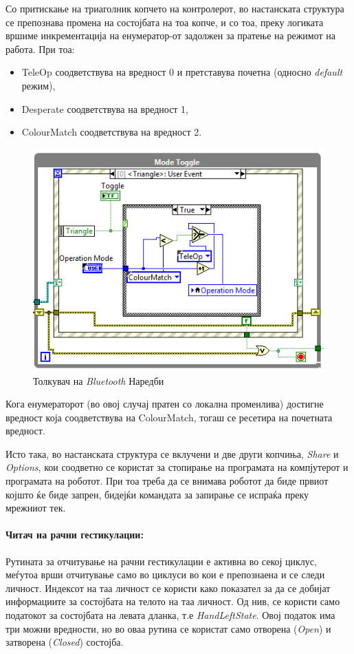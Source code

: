 \documentclass[11pt]{article}
\begin{document}
      Со притискање на триаголник копчето на контролерот, во настанската структура се препознава промена на состојбата на тоа копче, и со тоа, преку логиката вршиме инкрементација на енумератор-от задолжен за пратење на режимот на работа. При тоа:

      \begin{itemize}
        \item TeleOp соодветствува на вредност 0 и претставува почетна (односно \textit{default} режим),
        \item Desperate соодветствува на вредност 1,
        \item ColourMatch соодветствува на вредност 2.
        \end{itemize}

      \begin{figure}[H]
        \centering
        \includegraphics[width=0.75\linewidth]{./images/mode_switch.png}
        \caption{Толкувач на \textit{Bluetooth} Наредби}
        \end{figure}

      Кога енумераторот (во овој случај пратен со локална променлива) достигне вредност која соодветствува на ColourMatch, тогаш се ресетира на почетната вредност.

      Исто така, во настанската структура се вклучени и две други копчиња, \textit{Share} и \textit{Options}, кои соодветно се користат за стопирање на програмата на компјутерот и програмата на роботот. При тоа треба да се внимава роботот да биде првиот којшто ќе биде запрен, бидејќи командата за запирање се испраќа преку мрежниот тек.

    \paragraph{Читач на рачни гестикулации:\\}
      Рутината за отчитување на рачни гестикулации е активна во секој циклус, меѓутоа врши отчитување само во циклуси во кои е препознаена и се следи личност. Индексот на таа личност се користи како показател за да се добијат информациите за состојбата на телото на таа личност. Од нив, се користи само податокот за состојбата на левата дланка, т.е \textit{HandLeftState}. Овој податок има три можни вредности, но во оваа рутина се користат само отворена (\textit{Open}) и затворена (\textit{Closed}) состојба.
\end{document}
